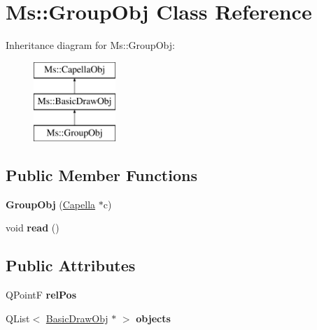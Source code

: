 \hypertarget{class_ms_1_1_group_obj}{}\section{Ms\+:\+:Group\+Obj Class Reference}
\label{class_ms_1_1_group_obj}
Inheritance diagram for Ms\+:\+:Group\+Obj\+:\begin{figure}[H]
\begin{center}
\leavevmode
\includegraphics[height=3.000000cm]{class_ms_1_1_group_obj}
\end{center}
\end{figure}
\subsection*{Public Member Functions}
\begin{DoxyCompactItemize}
\item 
\mbox{\label{class_ms_1_1_group_obj_aa2163b59b764f2437f8df341cb7e1d79}} 
{\bfseries Group\+Obj} (\hyperlink{class_ms_1_1_capella}{Capella} $\ast$c)
\item 
\mbox{\label{class_ms_1_1_group_obj_a417c82677c289b526a58e9b7bf0e1d63}} 
void {\bfseries read} ()
\end{DoxyCompactItemize}
\subsection*{Public Attributes}
\begin{DoxyCompactItemize}
\item 
\mbox{\label{class_ms_1_1_group_obj_a3ce9a9c43246c9162b13464a745468a9}} 
Q\+PointF {\bfseries rel\+Pos}
\item 
\mbox{\label{class_ms_1_1_group_obj_a9015753d39687eb8ad5c725cc5cf7c6a}} 
Q\+List$<$ \hyperlink{class_ms_1_1_basic_draw_obj}{Basic\+Draw\+Obj} $\ast$ $>$ {\bfseries objects}
\end{DoxyCompactItemize}
